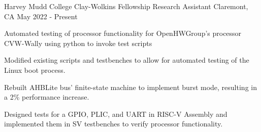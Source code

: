   \cventry
    {Harvey Mudd College} %
    {Clay-Wolkins Fellowship Research Assistant} %
    {Claremont, CA} %
    {May 2022 - Present} %
    {
    \begin{cvitems}
      \item {
      Automated testing of processor functionality for OpenHWGroup's processor CVW-Wally using python to invoke test scripts
      }
      \item{
      Modified existing scripts and testbenches to allow for automated testing of the Linux boot process.
      }
      \item{
      Rebuilt AHBLite bus' finite-state machine to implement burst mode, resulting in a 2\% performance increase.
      }
      \item{
      Designed tests for a GPIO, PLIC, and UART in RISC-V Assembly and implemented them in SV testbenches to verify processor functionality.
      }
    \end{cvitems}
    }

